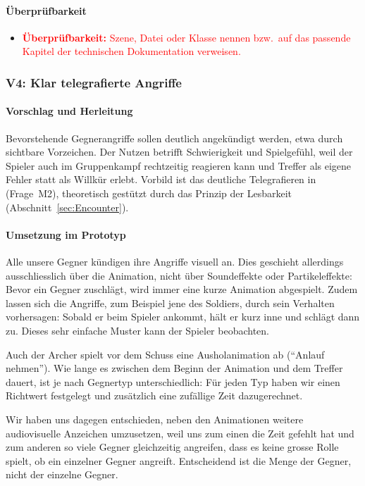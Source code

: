 \documentclass[../Main.tex]{subfiles}
\begin{document}
\paragraph{Überprüfbarkeit}
\begin{itemize}[leftmargin=1.5cm]
    \item \textcolor{red}{\textbf{Überprüfbarkeit:} Szene, Datei oder Klasse nennen bzw.\ auf das passende Kapitel der technischen Dokumentation verweisen.}
\end{itemize}

\subsubsection{V4: Klar telegrafierte Angriffe} \label{sec:V4}

\paragraph{Vorschlag und Herleitung}
Bevorstehende Gegnerangriffe sollen deutlich angekündigt werden, etwa durch sichtbare Vorzeichen. Der Nutzen betrifft Schwierigkeit und Spielgefühl, weil der Spieler auch im Gruppenkampf rechtzeitig reagieren kann und Treffer als eigene Fehler statt als Willkür erlebt. Vorbild ist das deutliche Telegrafieren in  (Frage~M2), theoretisch gestützt durch das Prinzip der Lesbarkeit (Abschnitt~\ref{sec:Encounter}).

\paragraph{Umsetzung im Prototyp}
Alle unsere Gegner kündigen ihre Angriffe visuell an. Dies geschieht allerdings ausschliesslich über die Animation, nicht über Soundeffekte oder Partikeleffekte: Bevor ein Gegner zuschlägt, wird immer eine kurze Animation abgespielt. Zudem lassen sich die Angriffe, zum Beispiel jene des Soldiers, durch sein Verhalten vorhersagen: Sobald er beim Spieler ankommt, hält er kurz inne und schlägt dann zu. Dieses sehr einfache Muster kann der Spieler beobachten.

Auch der Archer spielt vor dem Schuss eine Ausholanimation ab (\enquote{Anlauf nehmen}). Wie lange es zwischen dem Beginn der Animation und dem Treffer dauert, ist je nach Gegnertyp unterschiedlich: Für jeden Typ haben wir einen Richtwert festgelegt und zusätzlich eine zufällige Zeit dazugerechnet.

Wir haben uns dagegen entschieden, neben den Animationen weitere audiovisuelle Anzeichen umzusetzen, weil uns zum einen die Zeit gefehlt hat und zum anderen so viele Gegner gleichzeitig angreifen, dass es keine grosse Rolle spielt, ob ein einzelner Gegner angreift. Entscheidend ist die Menge der Gegner, nicht der einzelne Gegner.
\end{document}
